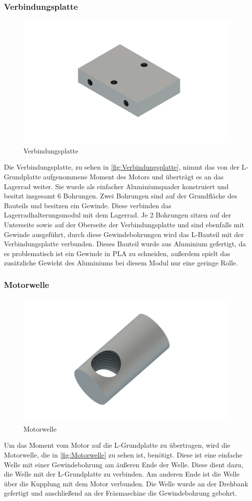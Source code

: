\subsubsection{Verbindungsplatte}
\begin{figure}
    \includegraphics[width=8 cm]{fig/mech/Verbindungsplatte}
    \caption{Verbindungsplatte}
    \label{fig:Verbindungsplatte}
\end{figure}
Die Verbindungsplatte, zu sehen in \autoref{fig:Verbindungsplatte}, nimmt das von der L-Grundplatte aufgenommene Moment des Motors und überträgt es an das Lagerrad weiter.
Sie wurde als einfacher Aluminiumquader konstruiert und besitzt insgesamt 6 Bohrungen. Zwei Bohrungen sind auf der
Grundfläche des Bauteils und besitzen ein Gewinde. Diese verbinden das Lagerradhalterungsmodul mit dem Lagerrad. Je 2
Bohrungen sitzen auf der Unterseite sowie auf der Oberseite der Verbindungsplatte und sind ebenfalls mit Gewinde
ausgeführt, durch diese Gewindebohrungen wird das L-Bauteil mit der Verbindungsplatte verbunden.
Dieses Bauteil wurde aus Aluminium gefertigt, da es problematisch ist ein Gewinde in PLA zu schneiden, außerdem spielt
das zusätzliche Gewicht des Aluminiums bei diesem Modul nur eine geringe Rolle.

\subsubsection{Motorwelle}
\begin{figure}
    \includegraphics[width=8 cm]{fig/mech/Motorwelle.png}
    \caption{Motorwelle}
    \label{fig:Motorwelle}
\end{figure}
Um das Moment vom Motor auf die L-Grundplatte zu übertragen, wird die Motorwelle, die in \autoref{fig:Motorwelle} zu sehen ist, benötigt. Diese ist eine einfache Welle
mit einer Gewindebohrung am äußeren Ende der Welle. Diese dient dazu, die Welle mit der L-Grundplatte zu verbinden.
Am anderen Ende ist die Welle über die Kupplung mit dem Motor verbunden.
Die Welle wurde an der Drehbank gefertigt und anschließend an der Fräsmaschine die Gewindebohrung gebohrt.

